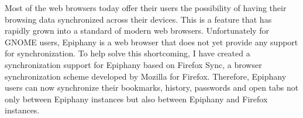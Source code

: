 
Most of the web browsers today offer their users the possibility of having their browsing data synchronized across their devices. This is a feature that has rapidly grown into a standard of modern web browsers. Unfortunately for GNOME users, Epiphany is a web browser that does not yet provide any support for synchronization. To help solve this shortcoming, I have created a synchronization support for Epiphany based on Firefox Sync, a browser synchronization scheme developed by Mozilla for Firefox. Therefore, Epiphany users can now synchronize their bookmarks, history, passwords and open tabs not only between Epiphany instances but also between Epiphany and Firefox instances.
